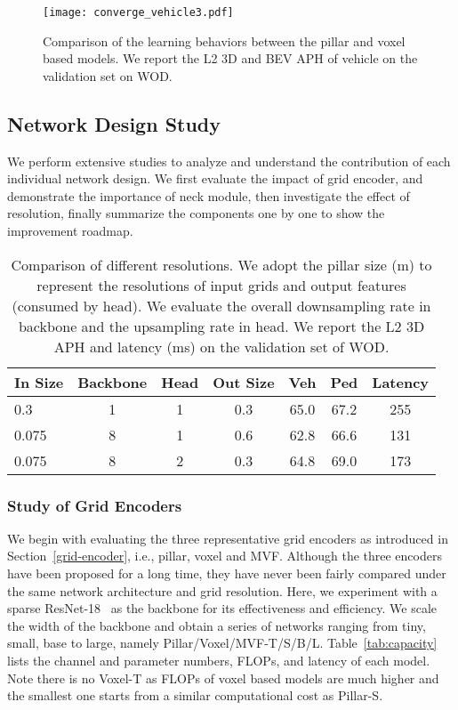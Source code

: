 \documentclass[10pt,twocolumn,letterpaper]{article}
\begin{document}
\begin{figure}[t]
  \centering
   \texttt{[image: converge\_vehicle3.pdf]}
   \vspace{-3mm}
   \caption{Comparison of the learning behaviors between the pillar and voxel based models. We report the L2 3D and BEV APH of vehicle on the validation set on WOD.}
   \label{fig:converage-vehicle}
   \vspace{-3mm}
\end{figure}

\subsection{Network Design Study}
\label{sec:study}

We perform extensive studies to analyze and understand the contribution of each individual network design. We first evaluate the impact of grid encoder, and demonstrate the importance of neck module, then investigate the effect of resolution, finally summarize the components one by one to show the improvement roadmap.   

\begin{table}[t]
\small
\tabcolsep=0.13cm
\centering
\begin{tabular}{lccc|c|c|c}
\hline
In Size & Backbone  & Head  & Out Size &  Veh & Ped & Latency \\ \hline
0.3 & 1 &  1 & 0.3 & 65.0 & 67.2 & 255 \\ 
0.075 & 8 & 1 & 0.6 &62.8 & 66.6 & 131 \\ 
0.075 & 8 & 2 & 0.3 & 64.8 & 69.0 & 173 \\ \hline
\end{tabular}
\caption{Comparison of different resolutions. We adopt the pillar size (m) to represent the resolutions of input grids and output features (consumed by head). We evaluate the overall downsampling rate in backbone and the upsampling rate in head. We report the L2 3D APH and latency (ms) on the validation set of WOD.} 
\label{tab:resolution}
\end{table}

\subsubsection{Study of Grid Encoders}
We begin with evaluating the three representative grid encoders as introduced in Section~\ref{grid-encoder}, i.e., pillar, voxel and MVF. Although the three encoders have been proposed for a long time, they have never been fairly compared under the same network architecture and grid resolution. Here, we experiment with a sparse ResNet-18~\cite{shi2022pillarnet} as the backbone for its effectiveness and efficiency. We scale the width of the backbone and obtain a series of networks ranging from tiny, small, base to large, namely Pillar/Voxel/MVF-T/S/B/L. Table~\ref{tab:capacity} lists the channel and parameter numbers, FLOPs, and latency of each model. Note there is no Voxel-T as FLOPs of voxel based models are much higher and the smallest one starts from a similar computational cost as Pillar-S.  
\end{document}

